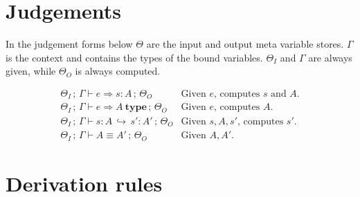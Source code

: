 \documentclass[a4paper,11pt]{article}
\newcommand\Infer[6]{#1\,;\,#2\vdash#3\Rightarrow#4:#5\,;\,#6}
\newcommand\InferType[5]{#1\,;\,#2\vdash#3\Rightarrow#4~\mathbf{type}\,;\,#5}
\newcommand\Equal[5]{#1\,;\,#2\vdash#3=#4:#5}
\newcommand\TEqual[5]{#1\,;\,#2\vdash#3\equiv#4\,;\,#5}
\newcommand\Expand[7]{#1\,;\,#2\vdash#3:#4{\,\hookrightarrow\,}#5:#6\,;\,#7}
\newcommand\CheckDecl[4]{#1\,;\,#2\vdash#3\to#4}
\begin{document}
\section{Judgements}

In the judgement forms below $\Theta$ are the input and output meta
variable stores. $\Gamma$ is the context and contains the types of the
bound variables. $\Theta_I$ and $\Gamma$ are always given, while
$\Theta_O$ is always computed.

    \[\begin{array}{ll}
        \Infer{\Theta_I}\Gamma esA{\Theta_O}      & \mbox{Given $e$, computes $s$ and $A$.} \\
        \InferType{\Theta_I}\Gamma eA{\Theta_O}      & \mbox{Given $e$, computes $A$.} \\
        \Expand{\Theta_I}\Gamma sA{s'}{A'}{\Theta_O}    & \mbox{Given $s,A,s'$, computes $s'$.} \\
        \TEqual{\Theta_I}\Gamma A{A'}\Theta_O  & \mbox{Given $A,A'$.}
    \end{array}\]
    

\section{Derivation rules}
\end{document}
